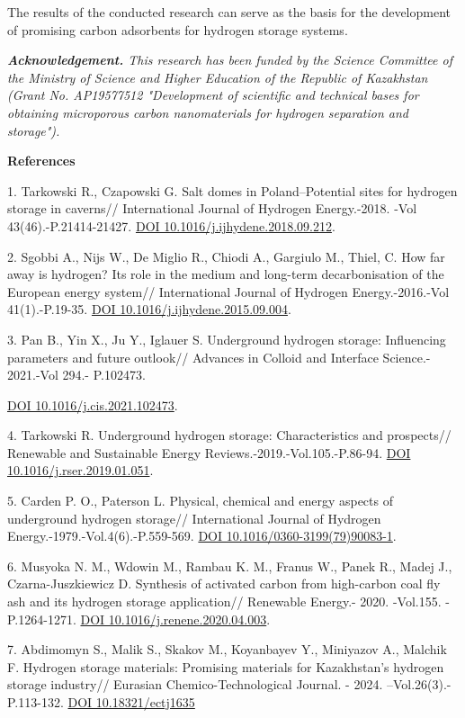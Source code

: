 The results of the conducted research can serve as the basis for the
development of promising carbon adsorbents for hydrogen storage systems.

\emph{{\bfseries Acknowledgement.} This research has been funded by the
Science Committee of the Ministry of Science and Higher Education of the
Republic of Kazakhstan (Grant No. AP19577512 "Development of scientific
and technical bases for obtaining microporous carbon nanomaterials for
hydrogen separation and storage").}

{\bfseries References}

1. Tarkowski R., Czapowski G. Salt domes in Poland--Potential sites for
hydrogen storage in caverns// International Journal of Hydrogen
Energy.-2018. -Vol 43(46).-P.21414-21427.
\href{https://doi.org/10.1016/j.ijhydene.2018.09.212}{DOI
10.1016/j.ijhydene.2018.09.212}.

2. Sgobbi A., Nijs W., De Miglio R., Chiodi A., Gargiulo M., Thiel, C.
How far away is hydrogen? Its role in the medium and long-term
decarbonisation of the European energy system// International Journal of
Hydrogen Energy.-2016.-Vol 41(1).-P.19-35.
\href{https://doi.org/10.1016/j.ijhydene.2015.09.004}{DOI
10.1016/j.ijhydene.2015.09.004}.

3. Pan B., Yin X., Ju Y., Iglauer S. Underground hydrogen storage:
Influencing parameters and future outlook// Advances in Colloid and
Interface Science.- 2021.-Vol 294.- P.102473.

\href{https://doi.org/10.1016/j.cis.2021.102473}{DOI
10.1016/j.cis.2021.102473}.

4. Tarkowski R. Underground hydrogen storage: Characteristics and
prospects// Renewable and Sustainable Energy
Reviews.-2019.-Vol.105.-P.86-94.
\href{https://doi.org/10.1016/j.rser.2019.01.051}{DOI
10.1016/j.rser.2019.01.051}.

5. Carden P. O., Paterson L. Physical, chemical and energy aspects of
underground hydrogen storage// International Journal of Hydrogen
Energy.-1979.-Vol.4(6).-P.559-569.
\href{https://doi.org/10.1016/0360-3199(79)90083-1}{DOI
10.1016/0360-3199(79)90083-1}.

6. Musyoka N. M., Wdowin M., Rambau K. M., Franus W., Panek R., Madej
J., Czarna-Juszkiewicz D. Synthesis of activated carbon from high-carbon
coal fly ash and its hydrogen storage application// Renewable Energy.-
2020. -Vol.155. -P.1264-1271.
\href{https://doi.org/10.1016/j.renene.2020.04.003}{DOI
10.1016/j.renene.2020.04.003}.

7. Abdimomyn S., Malik S., Skakov M., Koyanbayev Y., Miniyazov A.,
Malchik F. Hydrogen storage materials: Promising materials for
Kazakhstan's hydrogen storage industry// Eurasian Chemico-Technological
Journal. - 2024. --Vol.26(3).- P.113-132.
\href{https://doi.org/10.18321/ectj1635}{DOI 10.18321/ectj1635}

